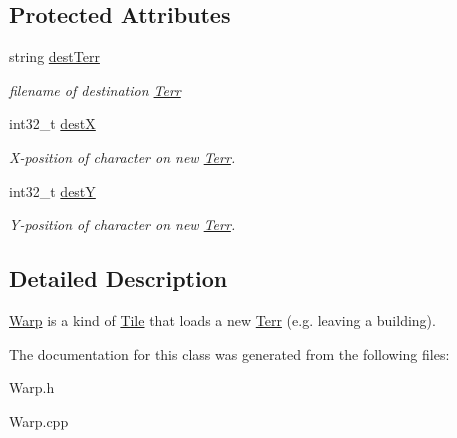 \subsection*{Protected Attributes}
\begin{DoxyCompactItemize}
\item 
string \hyperlink{class_warp_a37b259e72467ec5dfe8a6e4c3a137eb3}{dest\+Terr}\hypertarget{class_warp_a37b259e72467ec5dfe8a6e4c3a137eb3}{}\label{class_warp_a37b259e72467ec5dfe8a6e4c3a137eb3}

\begin{DoxyCompactList}\small\item\em filename of destination \hyperlink{class_terr}{Terr} \end{DoxyCompactList}\item 
int32\+\_\+t \hyperlink{class_warp_a26858fea3a441ee8359a3042ceee0353}{destX}\hypertarget{class_warp_a26858fea3a441ee8359a3042ceee0353}{}\label{class_warp_a26858fea3a441ee8359a3042ceee0353}

\begin{DoxyCompactList}\small\item\em X-\/position of character on new \hyperlink{class_terr}{Terr}. \end{DoxyCompactList}\item 
int32\+\_\+t \hyperlink{class_warp_a66db396122a3d9a2c565a26d171574f8}{destY}\hypertarget{class_warp_a66db396122a3d9a2c565a26d171574f8}{}\label{class_warp_a66db396122a3d9a2c565a26d171574f8}

\begin{DoxyCompactList}\small\item\em Y-\/position of character on new \hyperlink{class_terr}{Terr}. \end{DoxyCompactList}\end{DoxyCompactItemize}


\subsection{Detailed Description}
\hyperlink{class_warp}{Warp} is a kind of \hyperlink{class_tile}{Tile} that loads a new \hyperlink{class_terr}{Terr} (e.\+g. leaving a building). 

The documentation for this class was generated from the following files\+:\begin{DoxyCompactItemize}
\item 
Warp.\+h\item 
Warp.\+cpp\end{DoxyCompactItemize}
